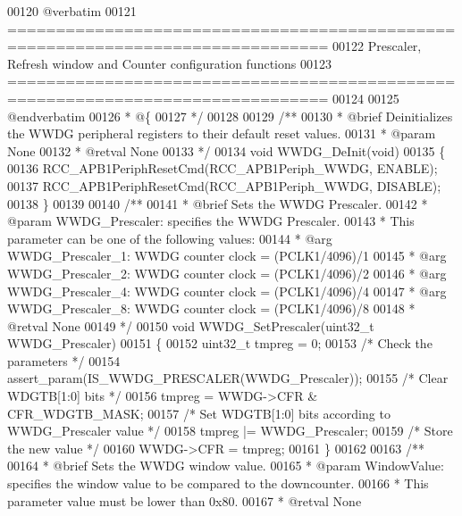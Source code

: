 \begin{DoxyCode}
00120 \textcolor{comment}{@verbatim   }
00121 \textcolor{comment}{ ===============================================================================}
00122 \textcolor{comment}{          Prescaler, Refresh window and Counter configuration functions}
00123 \textcolor{comment}{ ===============================================================================  }
00124 \textcolor{comment}{}
00125 \textcolor{comment}{@endverbatim}
00126 \textcolor{comment}{  * @\{}
00127 \textcolor{comment}{  */}
00128 
00129 \textcolor{comment}{/**}
00130 \textcolor{comment}{  * @brief  Deinitializes the WWDG peripheral registers to their default reset values.}
00131 \textcolor{comment}{  * @param  None}
00132 \textcolor{comment}{  * @retval None}
00133 \textcolor{comment}{  */}
00134 \textcolor{keywordtype}{void} WWDG_DeInit(\textcolor{keywordtype}{void})
00135 \{
00136   RCC_APB1PeriphResetCmd(RCC_APB1Periph_WWDG, ENABLE);
00137   RCC_APB1PeriphResetCmd(RCC_APB1Periph_WWDG, DISABLE);
00138 \}
00139 
00140 \textcolor{comment}{/**}
00141 \textcolor{comment}{  * @brief  Sets the WWDG Prescaler.}
00142 \textcolor{comment}{  * @param  WWDG\_Prescaler: specifies the WWDG Prescaler.}
00143 \textcolor{comment}{  *   This parameter can be one of the following values:}
00144 \textcolor{comment}{  *     @arg WWDG\_Prescaler\_1: WWDG counter clock = (PCLK1/4096)/1}
00145 \textcolor{comment}{  *     @arg WWDG\_Prescaler\_2: WWDG counter clock = (PCLK1/4096)/2}
00146 \textcolor{comment}{  *     @arg WWDG\_Prescaler\_4: WWDG counter clock = (PCLK1/4096)/4}
00147 \textcolor{comment}{  *     @arg WWDG\_Prescaler\_8: WWDG counter clock = (PCLK1/4096)/8}
00148 \textcolor{comment}{  * @retval None}
00149 \textcolor{comment}{  */}
00150 \textcolor{keywordtype}{void} WWDG_SetPrescaler(uint32\_t WWDG\_Prescaler)
00151 \{
00152   uint32\_t tmpreg = 0;
00153   \textcolor{comment}{/* Check the parameters */}
00154   assert_param(IS\_WWDG\_PRESCALER(WWDG\_Prescaler));
00155   \textcolor{comment}{/* Clear WDGTB[1:0] bits */}
00156   tmpreg = WWDG->CFR & CFR_WDGTB_MASK;
00157   \textcolor{comment}{/* Set WDGTB[1:0] bits according to WWDG\_Prescaler value */}
00158   tmpreg |= WWDG\_Prescaler;
00159   \textcolor{comment}{/* Store the new value */}
00160   WWDG->CFR = tmpreg;
00161 \}
00162 
00163 \textcolor{comment}{/**}
00164 \textcolor{comment}{  * @brief  Sets the WWDG window value.}
00165 \textcolor{comment}{  * @param  WindowValue: specifies the window value to be compared to the downcounter.}
00166 \textcolor{comment}{  *   This parameter value must be lower than 0x80.}
00167 \textcolor{comment}{  * @retval None}

\end{DoxyCode}
